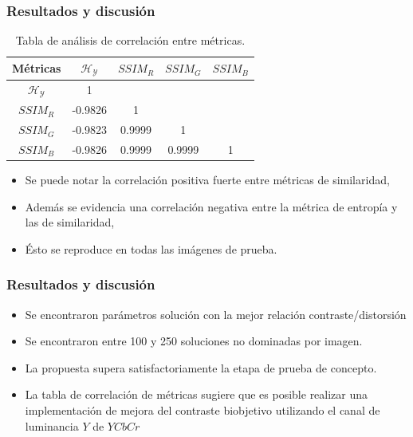 \documentclass[usenames,dvipsnames]{beamer}
\begin{document}
\begin{frame}
\frametitle{Resultados y discusión} 
\begin{table}[H]
\setlength{\abovecaptionskip}{2pt plus 3pt minus 2pt} %
\caption[Parámetros de entrada para $MOPSO$]{Tabla de análisis de correlación entre métricas.}
\begin{center}
\begin{tabular}{||c | c c c c||} 
\hline
Métricas & $\mathscr{H_Y}$ & $SSIM_R$ & $SSIM_G$ & $SSIM_B$ \\ 
\hline
$\mathscr{H_Y}$ & 1 &   &   &  \\ 
\hline
$SSIM_R$ & -0.9826  & 1 &  &  \\ 
\hline
$SSIM_G$ & -0.9823 & 0.9999   & 1   &  \\ 
\hline
$SSIM_B$ & -0.9826 & 0.9999   & 0.9999   & 1 \\ 
\hline
\end{tabular}
\end{center}
\label{table:correlacion}
\end{table}

\begin{itemize}
\item Se puede notar la correlación positiva fuerte entre métricas de similaridad,
\item Además se evidencia una correlación negativa entre la métrica de entropía y las de similaridad,
\item Ésto se reproduce en todas las imágenes de prueba.
\end{itemize}

\end{frame}

\begin{frame}
\frametitle{Resultados y discusión} 
\begin{exampleblock}{}

\begin{itemize}
	\item Se encontraron parámetros solución con la mejor relación contraste/distorsión
	\item Se encontraron entre 100 y 250 soluciones no dominadas por imagen.
	\item La propuesta supera satisfactoriamente la etapa de prueba de concepto.
	\item La tabla de correlación de métricas sugiere que es posible realizar una implementación de mejora del contraste biobjetivo utilizando el canal de luminancia $Y$ de $YCbCr$
\end{itemize}

\end{exampleblock}

\end{frame}
\end{document}

